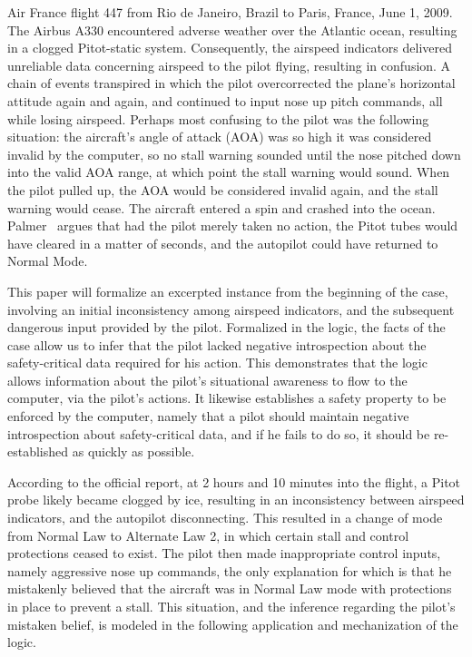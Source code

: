 Air France flight 447 from Rio de Janeiro, Brazil to Paris, France, June 1, 2009. The Airbus A330 encountered adverse weather over the Atlantic ocean, resulting in a clogged Pitot-static system. Consequently, the airspeed indicators delivered unreliable data concerning airspeed to the pilot flying, resulting in confusion. A chain of events transpired in which the pilot overcorrected the plane's horizontal attitude again and again, and continued to input nose up pitch commands, all while losing airspeed. Perhaps most confusing to the pilot was the following situation: the aircraft's  angle of attack (AOA) was so high it was considered invalid by the computer, so no stall warning sounded until the nose pitched down into the valid AOA range, at which point the stall warning would sound. When the pilot pulled up, the AOA would be considered invalid again, and the stall warning would cease. The aircraft entered a spin and crashed into the ocean. Palmer~\cite{AFPalmer} argues that had the pilot merely taken no action, the Pitot tubes would have cleared in a matter of seconds, and the autopilot could have returned to Normal Mode. 

This paper will formalize an excerpted instance from the beginning of the case, involving an initial inconsistency among airspeed indicators, and the subsequent dangerous input provided by the pilot. Formalized in the logic, the facts of the case allow us to infer that the pilot lacked negative introspection about the safety-critical data required for his action. This demonstrates that the logic allows information about the pilot's situational awareness to flow to the computer, via the pilot's actions. It likewise establishes a safety property to be enforced by the computer, namely that a pilot should maintain negative introspection about safety-critical data, and if he fails to do so, it should be re-established as quickly as possible.

According to the official report, at 2 hours and 10 minutes into the flight, a Pitot probe likely became clogged by ice, resulting in an inconsistency between airspeed indicators, and the autopilot disconnecting. This resulted in a change of mode from Normal Law to Alternate Law 2, in which certain stall and control protections ceased to exist. The pilot then made inappropriate control inputs, namely aggressive nose up commands, the only explanation for which is that he mistakenly believed that the aircraft was in Normal Law mode with protections in place to prevent a stall. This situation, and the inference regarding the pilot's mistaken belief, is modeled in the following application and mechanization of the logic.


